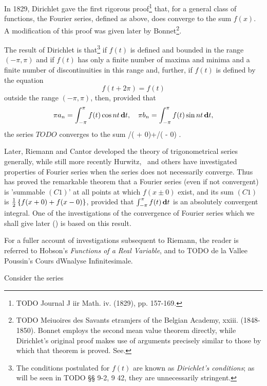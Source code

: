 %
%

In 1829, Dirichlet gave the first rigorous proof\footnote{TODO Journal J iir Math. iv. (1829), pp. 157-169.}
that, for a general class of functions, the Fourier series, defined as above, does
converge to the sum $f(x)$. A modification of this proof was given later
by Bonnet\footnote{TODO Meiuoires des Savants etramjers of the Belgian Academy, xxiii.
(1848-1850). Bonnet employs the second mean value theorem directly,
while Dirichlet's original proof makes use of arguments precisely
similar to those by which that theorem is proved. See.}.

The result of Dirichlet is that\footnote{The conditions postulated for $f(t)$
  are known as \emph{Dirichlet's conditions}; as will be seen in TODO §§ 9-2, 9 42, they are unnecessarily
  stringent.}
if $f(t)$ is defined and bounded in the
range $(-\pi, \pi)$ and if $f(t)$ has only a finite number of maxima and
minima and a finite number of discontinuities in this range and,
further, if $f(t)$ is defined by the equation
$$
f(t + 2 \pi) = f(t)
$$
outside the range $(-\pi, \pi)$, then, provided that
$$
\pi a_{n}
=
\int_{-\pi}^{\pi} f(t) \cos nt \, \mathbf{d} t,
\quad
\pi b_{n}
=
\int_{-\pi}^{\pi} f(t) \sin nt \, \mathbf{d} t,
$$
the series $TODO$ converges to the sum /( +
0)+/( - 0) .

Later, Riemann and Cantor developed the theory of trigonometrical
series generally, while still more recently Hurwitz, \Fejer\ and others
have investigated properties of Fourier series when the series does
not necessarily converge. Thus \Fejer has proved the remarkable
theorem that a Fourier series (even if not convergent) is 'summable
$(C1)$' at all points at which $f(x \pm 0)$ exist, and its sum $(C1)$ is
$\frac{1}{2} \left\{  f(x+0) + f(x-0)  \right\}$,
provided that $\int_{-\pi}^{\pi} f(t) \, \mathbf{d} t$ is an absolutely convergent integral.
One of the investigations of the convergence of Fourier series which we shall give later
() is based on this result.

For a fuller account of investigations subsequent to Riemann, the
reader is referred to Hobson's \emph{Functions of a Real Variable}, and to
TODO de la Vallee Poussin's Cours dWnalyse Infinitesimale.


Consider the series


